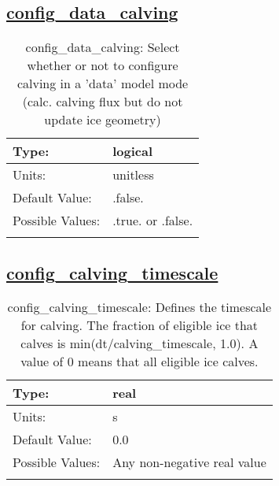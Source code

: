 \subsection[config\_data\_calving]{\hyperref[sec:nm_tab_calving]{config\_data\_calving}}
\label{subsec:nm_sec_config_data_calving}
\begin{center}
\begin{longtable}{| p{2.0in} || p{4.0in} |}
    \hline
    Type: & logical \\
    \hline
    Units: & \si{unitless} \\
    \hline
    Default Value: & .false. \\
    \hline
    Possible Values: & .true. or .false. \\
    \hline
    \caption{config\_data\_calving: Select whether or not to configure calving in a 'data' model mode (calc. calving flux but do not update ice geometry)}
\end{longtable}
\end{center}
\subsection[config\_calving\_timescale]{\hyperref[sec:nm_tab_calving]{config\_calving\_timescale}}
\label{subsec:nm_sec_config_calving_timescale}
\begin{center}
\begin{longtable}{| p{2.0in} || p{4.0in} |}
    \hline
    Type: & real \\
    \hline
    Units: & \si{s} \\
    \hline
    Default Value: & 0.0 \\
    \hline
    Possible Values: & Any non-negative real value \\
    \hline
    \caption{config\_calving\_timescale: Defines the timescale for calving. The fraction of eligible ice that calves is min(dt/calving\_timescale, 1.0). A value of 0 means that all eligible ice calves.}
\end{longtable}
\end{center}
